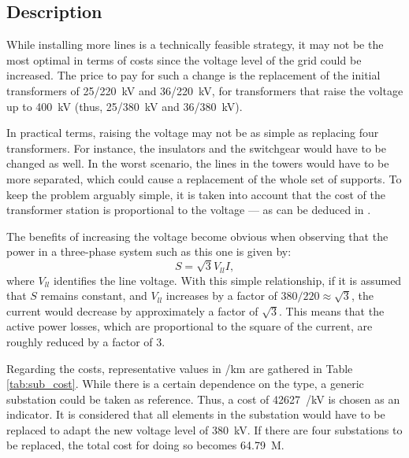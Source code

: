 \subsection{Description}
While installing more lines is a technically feasible strategy, it may not be the most optimal in terms of costs since the voltage level of the grid could be increased. The price to pay for such a change is the replacement of the initial transformers of 25/220~kV and 36/220~kV, for transformers that raise the voltage up to 400~kV (thus, 25/380~kV and 36/380~kV).

In practical terms, raising the voltage may not be as simple as replacing four transformers. For instance, the insulators and the switchgear would have to be changed as well. In the worst scenario, the lines in the towers would have to be more separated, which could cause a replacement of the whole set of supports. To keep the problem arguably simple, it is taken into account that the cost of the transformer station is proportional to the voltage --- as can be deduced in \cite{acer}.

The benefits of increasing the voltage become obvious when observing that the power in a three-phase system such as this one is given by:
\begin{equation}
  S = \sqrt{3}V_{ll}I,
\end{equation}
where $V_{ll}$ identifies the line voltage. With this simple relationship, if it is assumed that $S$ remains constant, and $V_{ll}$ increases by a factor of $380/220\approx \sqrt{3}$, the current would decrease by approximately a factor of $\sqrt{3}$. This means that the active power losses, which are proportional to the square of the current, are roughly reduced by a factor of 3. 

Regarding the costs, representative values in \texteuro/km are gathered in Table \ref{tab:sub_cost}. While there is a certain dependence on the type, a generic substation could be taken as reference. Thus, a cost of 42627~\texteuro/kV is chosen as an indicator. It is considered that all elements in the substation would have to be replaced to adapt the new voltage level of 380~kV. If there are four substations to be replaced, the total cost for doing so becomes 64.79~M\texteuro. 

